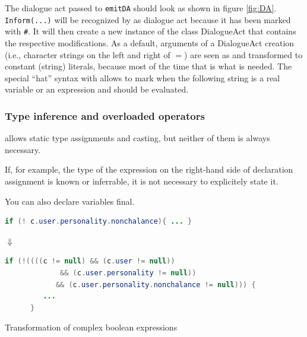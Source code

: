 The dialogue act passed to \texttt{emitDA} should look as shown in figure \ref{fig:DA}. \texttt{Inform}\verb|(...)| will be recognized by \vonda as dialogue act because it has been marked with \verb|#|. It will then create a new instance of the class DialogueAct that contains the respective modifications. As a default, arguments of a DialogueAct creation (i.e., character strings on the left and right of $=$) are seen as and transformed to constant (string) literals, because most of the time that is what is needed. The special ``hat'' syntax with \caret allows to mark when the following string is a real variable or an expression and should be evaluated.

\subsubsection{Type inference and overloaded operators}
\label{sec:typeinference}

%
\vonda allows static type assignments and casting, but neither of them is always necessary.


If, for example, the type of the expression on the right-hand side of declaration assignment is known or inferrable, it is not necessary to explicitely state it.

You can also declare variables final.

\begin{table}[htbp]
  \centering
  \begin{small}
    \begin{lstlisting}[language=Java]
      if (! c.user.personality.nonchalance){ ... }
    \end{lstlisting}

    {\Large$\Downarrow$}\\

    \begin{lstlisting}[language=Java]
      if (!((((c != null) && (c.user != null))
             && (c.user.personality != null))
            && (c.user.personality.nonchalance != null))) {
         ...
      }
\end{lstlisting}
\end{small}

\caption{Transformation of complex boolean expressions}
\label{tab:multi-predaccess}
\end{table}
\vspace*{10pt}

